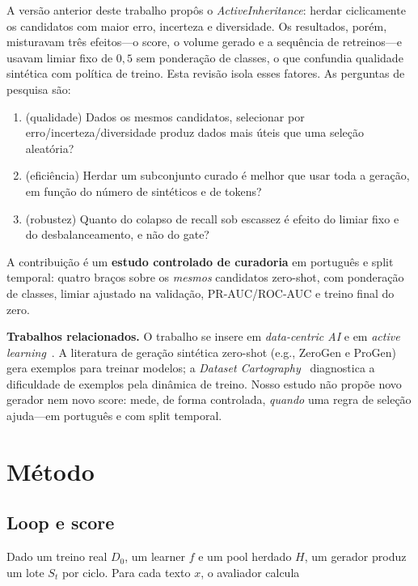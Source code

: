 \documentclass[conference]{IEEEtran}
\begin{document}
A versão anterior deste trabalho propôs o \emph{ActiveInheritance}: herdar ciclicamente os candidatos com maior erro, incerteza e diversidade. Os resultados, porém, misturavam três efeitos---o score, o volume gerado e a sequência de retreinos---e usavam limiar fixo de $0{,}5$ sem ponderação de classes, o que confundia qualidade sintética com política de treino. Esta revisão isola esses fatores. As perguntas de pesquisa são:

\begin{enumerate}
\item[\textbf{RQ1}] (qualidade) Dados os mesmos candidatos, selecionar por erro/incerteza/diversidade produz dados mais úteis que uma seleção aleatória?
\item[\textbf{RQ2}] (eficiência) Herdar um subconjunto curado é melhor que usar toda a geração, em função do número de sintéticos e de tokens?
\item[\textbf{RQ3}] (robustez) Quanto do colapso de recall sob escassez é efeito do limiar fixo e do desbalanceamento, e não do gate?
\end{enumerate}

A contribuição é um \textbf{estudo controlado de curadoria} em português e split temporal: quatro braços sobre os \emph{mesmos} candidatos zero-shot, com ponderação de classes, limiar ajustado na validação, PR-AUC/ROC-AUC e treino final do zero.

\textbf{Trabalhos relacionados.} O trabalho se insere em \emph{data-centric AI} e em \emph{active learning}~\cite{settles2012}. A literatura de geração sintética zero-shot (e.g., ZeroGen e ProGen) gera exemplos para treinar modelos; a \emph{Dataset Cartography}~\cite{swayamdipta2020} diagnostica a dificuldade de exemplos pela dinâmica de treino. Nosso estudo não propõe novo gerador nem novo score: mede, de forma controlada, \emph{quando} uma regra de seleção ajuda---em português e com split temporal. %

\section{Método}

\subsection{Loop e score}

Dado um treino real $D_0$, um learner $f$ e um pool herdado $H$, um gerador produz um lote $S_t$ por ciclo. Para cada texto $x$, o avaliador calcula
\end{document}
